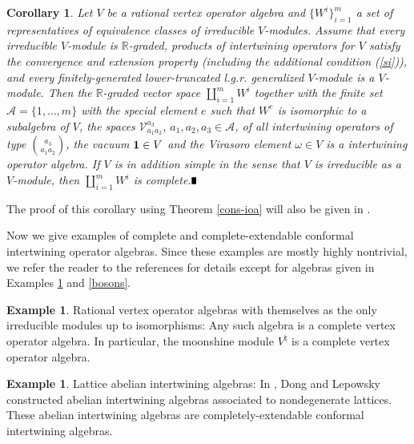 \documentclass{amsproc}
\newtheorem{cor}[thm]{Corollary}
\theoremstyle{definition}
\newtheorem{expl}[thm]{Example}
\theoremstyle{remark}
\newcommand{\halmos}{\rule{1ex}{1.4ex}}
\newcommand{\epf}{\hspace*{\fill}\mbox{$\halmos$}}
\numberwithin{equation}{section}
\begin{document}
\begin{cor}
Let $V$ be a rational 
vertex operator algebra and 
$\{W^{i}\}_{i=1}^{m}$ 
a set of representatives of equivalence classes of
irreducible $V$-modules. Assume that every irreducible $V$-module
is $\mathbb{R}$-graded, products of
intertwining operators
for $V$ satisfy the
convergence and extension property (including the 
additional condition (\ref{si})), and  
every finitely-generated
lower-truncated  l.g.r. generalized 
$V$-module is a $V$-module. Then the 
$\mathbb{R}$-graded vector space
$\coprod_{i=1}^{m}W^{i}$ together with the finite set 
$\mathcal{A}=\{1, \dots, m\}$ with
the special element $e$ such that $W^{e}$ is isomorphic to a
subalgebra of $V$, 
the spaces $\mathcal{V}_{a_{1}a_{2}}^{a_{3}}$, $a_{1}, a_{2}, a_{3}\in
\mathcal{A}$, of all intertwining operators of type
$\binom{a_{3}}{a_{1}a_{2}}$, 
the vacuum ${\bf 1}\in V$ and the Virasoro element
$\omega\in V$ is a  intertwining operator algebra. If $V$ is in addition 
simple in the sense that $V$ is irreducible as a $V$-module, 
then $\coprod_{i=1}^{m}W^{i}$ is complete.\epf
\end{cor}

The proof of this corollary using Theorem \ref{cons-ioa} will also be 
given in \cite{H7}. 

Now we give examples of complete and complete-extendable conformal 
intertwining operator algebras. Since these examples are mostly highly 
nontrivial, we refer the reader to the references for details except
for algebras given in Examples \ref{moonshine} and \ref{bosons}.


\begin{expl}\label{moonshine}
{\rm Rational vertex operator algebras with themselves as the only
irreducible modules up to isomorphisms: 
Any such algebra is a complete vertex operator
algebra. In particular, the moonshine module $V^{\natural}$ is a
complete vertex operator algebra.}
\end{expl}


\begin{expl}
{\rm Lattice abelian intertwining algebras: In \cite{DL2}, 
Dong and Lepowsky constructed abelian
intertwining algebras associated to nondegenerate lattices. These
abelian intertwining algebras are completely-extendable
conformal intertwining algebras.}
\end{expl}
\end{document}
